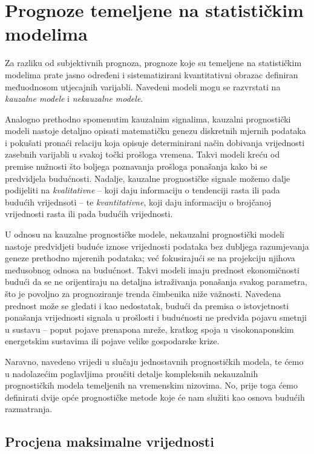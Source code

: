 \documentclass[a4paper,12pt,oneside]{memoir}
\begin{document}
        \section{Prognoze temeljene na statističkim modelima}
            Za razliku od subjektivnih prognoza, prognoze koje su temeljene na statističkim modelima prate jasno određeni i sistematizirani kvantitativni obrazac definiran međuodnosom utjecajnih varijabli. Navedeni modeli mogu se razvrstati na \textit{kauzalne modele} i \textit{nekauzalne modele}.\cite{Holden}
            
            Analogno prethodno spomenutim kauzalnim signalima, kauzalni prognostički modeli nastoje detaljno opisati matematičku genezu diskretnih mjernih podataka i pokušati pronaći relaciju koja opisuje determinirani način dobivanja vrijednosti zasebnih varijabli u svakoj točki prošloga vremena. Takvi modeli kreću od premise nužnosti što boljega poznavanja prošloga ponašanja kako bi se predvidjela budućnosti. Nadalje, kauzalne prognostičke signale možemo dalje podijeliti na \textit{kvalitativne} -- koji daju informaciju o tendenciji rasta ili pada budućih vrijednsoti -- te \textit{kvantitativne}, koji daju informaciju o brojčanoj vrijednosti rasta ili pada budućih vrijednosti.
            
            
            U odnosu na kauzalne prognostičke modele, nekauzalni prognostički modeli nastoje predvidjeti buduće iznose vrijednosti podataka bez dubljega razumjevanja geneze prethodno mjerenih podataka; već fokusirajući se na projekciju njihova međusobnog odnosa na budućnost. Takvi modeli imaju prednost ekonomičnosti budući da se ne orijentiraju na detaljna istraživanja ponašanja svakog parametra, što je povoljno za prognoziranje trenda čimbenika niže važnosti. Navedena prednost može se gledati i kao nedostatak, budući da premisa o istovjetnosti ponašanja vrijednosti signala u prošlosti i budućnosti ne predviđa pojavu smetnji u sustavu -- poput pojave prenapona mreže, kratkog spoja u visokonaponskim energetskim sustavima ili pojave velike gospodarske krize. 
            
            
            Naravno, navedeno vrijedi u slučaju jednostavnih prognostičkih modela, te ćemo u nadolazećim poglavljima proučiti detalje kompleksnih nekauzalnih prognostičkih modela temeljenih na vremenskim nizovima. No, prije toga ćemo definirati dvije opće prognostičke metode koje će nam služiti kao osnova budućih razmatranja.

            \subsection{Procjena maksimalne vrijednosti}
\end{document}
